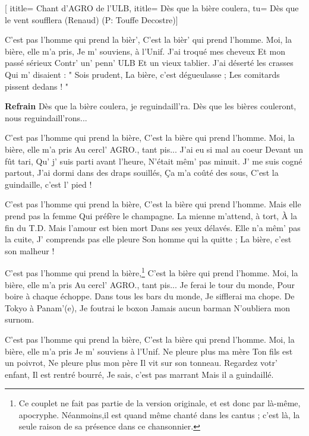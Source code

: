 [
ititle= {Chant d'AGRO de l'ULB},
ititle= {Dès que la bière coulera},
tu= {Dès que le vent soufflera (Renaud) (P: Touffe Decostre)}]


\beginverse
C'est pas l'homme qui prend la bièr',
C'est la bièr' qui prend l'homme.
Moi, la bière, elle m'a pris,
Je m' souviens, à l'Unif.
J'ai troqué mes cheveux
Et mon passé sérieux
Contr' un' penn' ULB
Et un vieux tablier.
J'ai déserté les crasses
Qui m' disaient : " Sois prudent,
La bière, c'est dégueulasse ;
Les comitards pissent dedans ! "
\endverse

\beginchorus
\textbf {Refrain}
Dès que la bière coulera, je reguindaill'ra.
Dès que les bières couleront, nous reguindaill'rons...
\endchorus

\beginverse
C'est pas l'homme qui prend la bière,
C'est la bière qui prend l'homme.
Moi, la bière, elle m'a pris
Au cercl' AGRO., tant pis...
J'ai eu si mal au coeur
Devant un fût tari,
Qu' j' suis parti avant l'heure,
N'était mêm' pas minuit.
J' me suis cogné partout,
J'ai dormi dans des draps souillés,
Ça m'a coûté des sous,
C'est la guindaille, c'est l' pied !
\endverse

\beginverse
C'est pas l'homme qui prend la bière,
C'est la bière qui prend l'homme.
Mais elle prend pas la femme
Qui préfère le champagne.
La mienne m'attend, à tort,
À la fin du T.D.
Mais l'amour est bien mort
Dans ses yeux délavés.
Elle n'a mêm' pas la cuite,
J' comprends pas elle pleure
Son homme qui la quitte ;
La bière, c'est son malheur !
\endverse

\beginverse
C'est pas l'homme qui prend la bière,\footnote {Ce couplet ne fait pas partie de la version originale, et est donc par là-même, apocryphe. Néanmoins,il est quand même chanté dans les cantus ; c'est là, la seule raison de sa présence dans ce chansonnier.}
C'est la bière qui prend l'homme.
Moi, la bière, elle m'a pris
Au cercl' AGRO., tant pis...
Je ferai le tour du monde,
Pour boire à chaque échoppe.
Dans tous les bars du monde,
Je sifflerai ma chope.
De Tokyo à Panam'(e),
Je foutrai le boxon
Jamais aucun barman
N'oubliera mon surnom.
\endverse

\beginverse
C'est pas l'homme qui prend la bière,
C'est la bière qui prend l'homme.
Moi, la bière, elle m'a pris
Je m' souviens à l'Unif.
Ne pleure plus ma mère
Ton fils est un poivrot,
Ne pleure plus mon père
Il vit sur son tonneau.
Regardez votr' enfant,
Il est rentré bourré,
Je sais, c'est pas marrant
Mais il a guindaillé.
\endverse

\endsong
